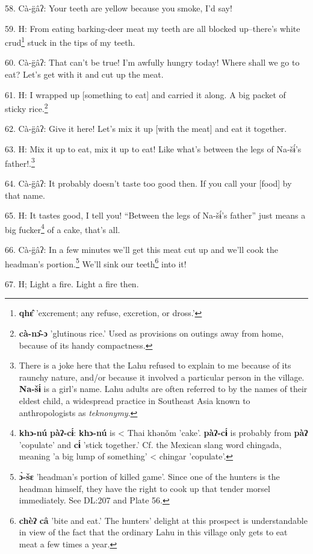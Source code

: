 58. Cà-g̈âʔ: Your teeth are yellow because you smoke, I'd say!

59. H: From eating barking-deer meat my teeth are all blocked up--there's white
crud\footnote{\textbf{qhɛ̂} 'excrement; any refuse, excretion, or dross.'} stuck in the tips of my teeth.

60. Cà-g̈âʔ: That can't be true! I'm awfully hungry today! Where shall we go
to eat? Let's get with it and cut up the meat.

61. H: I wrapped up [something to eat] and carried it along. A big packet of sticky
rice.\footnote{\textbf{cà-nɔ̂-ɔ} 'glutinous rice.' Used as provisions on outings away from home, because of its handy compactness.}

62. Cà-g̈âʔ: Give it here! Let's mix it up [with the meat] and eat it together.

63. H: Mix it up to eat, mix it up to eat! Like what's between the legs of Na-šɨ́'s
father!.\footnote{There is a joke here that the Lahu refused to explain to me because of its raunchy nature, and/or because it involved a particular person in the village. \textbf{Na-šɨ́} is a girl's name. Lahu adults are often referred to by the names of their eldest child, a widespread practice in Southeast Asia known to anthropologists as \textit{teknonymy}.}


64. Cà-g̈âʔ: It probably doesn't taste too good then. If you call your [food]
by that name.

65. H: It tastes good, I tell you! ``Between the legs of Na-šɨ́'s father''
just means a big fucker\footnote{\textbf{khɔ-nú} \textbf{pàʔ-cɨ́}: \textbf{khɔ-nú} is < Thai khənǒm 'cake'. \textbf{pàʔ-cɨ́} is probably from \textbf{pàʔ} 'copulate' and \textbf{cɨ́} 'stick together.' Cf. the Mexican slang word chingada, meaning 'a big lump of something' < chingar 'copulate'.} of a cake, that's all.

66. Cà-g̈âʔ: In a few minutes we'll get this meat cut up and we'll cook the
headman's portion.\footnote{\textbf{ɔ̀-šɛ} 'headman's portion of killed game'. Since one of the hunters is the headman himself, they have the right to cook up that tender morsel immediately. See DL:207 and Plate 56.} We'll sink our teeth\footnote{\textbf{chèʔ} \textbf{câ} 'bite and eat.' The hunters' delight at this prospect is understandable in view of the fact that the ordinary Lahu in this village only gets to eat meat a few times a year.} into it!

67. H; Light a fire. Light a fire then.

